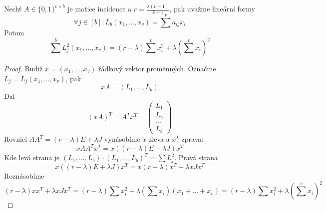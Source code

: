 
\begin{lemma}\label{lin_form}
	Nechť $A \in \{ 0, 1\}^{v \times b}$ je matice incidence a $r = \frac{\lambda (v - 1)}{k - 1}$, pak uvažme lineární formy
	\[ \forall j \in [b]: L_b(x_1, \ldots, x_v) = \sum^v a_{ij} x_i \]
	Potom
	\[ \sum^b L^2_j(x_1, \ldots, x_v) = (r - \lambda) \sum^v x^2_i + \lambda\left(\sum^v x_i \right)^2 \]
\end{lemma}
\begin{proof}
	Budiž $x = (x_1, \ldots, x_v)$ řádkový vektor proměnných.
	Označme $L_j = L_j(x_1, \ldots, x_v)$, pak
	\[ xA = (L_1, \ldots, L_b) \]
	Dal
	\[ (xA)^T = A^Tx^T =
	\begin{pmatrix}
	L_1\\
	L_2\\
	\ldots\\
	L_b
	\end{pmatrix}
	\]
	Rovnici $AA^T = (r - \lambda) E + \lambda J$ vynásobíme $x$ zleva a $x^T$ zprava:
	\[ xAA^Tx^T = x((r - \lambda) E + \lambda J)x^T \]
	Kde levá strana je $(L_1, \ldots, L_b) \cdot (L_1, \ldots, L_b)^T = \sum L_j^2$.
	Pravá strana
	\[ x((r - \lambda) E + \lambda J)x^T = x (r - \lambda) x^T + \lambda x J x^T \]
	Roznásobíme
	\[ (r - \lambda) x x^T + \lambda x J x^T = (r - \lambda) \sum x_i^2 + \lambda (\sum x_i) (x_1 + \ldots + x_v) = (r - \lambda) \sum x_i^2 + \lambda\left(\sum^v x_i \right)^2 \]
\end{proof}

